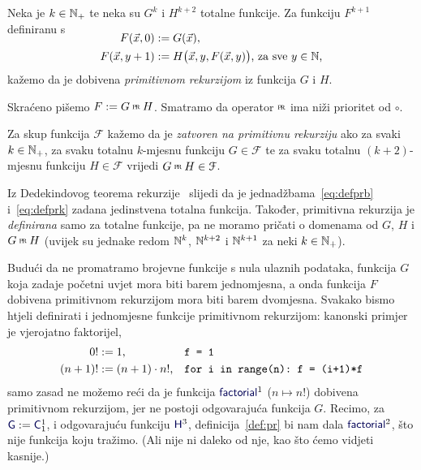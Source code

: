 
\begin{definicija}[{name=[primitivna rekurzija]}]\label{def:pr}
Neka je $k\in{\mathbb N}_+$ te neka su $G^k$ i $H^{k+2}$ totalne funkcije. Za funkciju $F^{k+1}$ definiranu s
\begin{align}
\SwapAboveDisplaySkip
\label{eq:defprb}
F(\vec x,0)&:=G(\vec x)\text,\\
\label{eq:defprk}
F(\vec x,y+1)&:=H\bigl(\vec x,y,F(\vec x,y)\bigr)\text{, za sve $y\in\N$,}
\end{align}
kažemo da je dobivena \emph{primitivnom rekurzijom} iz funkcija $G$ i $H$.

	Skraćeno pišemo $F:=G\pr H$. Smatramo da operator $\pr$ ima niži prioritet od $\circ$.

Za skup funkcija $\mathcal F$ kažemo da je \emph{zatvoren na primitivnu rekurziju} ako za svaki $k\in{\mathbb N}_+$, za svaku totalnu $k$-mjesnu funkciju $G\in\mathcal F$ te za svaku totalnu $(k+2)$-mjesnu funkciju $H\in\mathcal F$ vrijedi $G\pr H\in\mathcal F$.
\end{definicija}

\begin{napomena}[{name=[ulazi i izlaz primitivne rekurzije su totalne funkcije]}]\label{nap:prtot}
	Iz Dedekindovog teorema rekurzije~\cite{skr:VukTS} slijedi da je jednadžbama~\eqref{eq:defprb} i~\eqref{eq:defprk} zadana jedinstvena totalna funkcija. Također, primitivna rekurzija je \emph{definirana} samo za totalne funkcije, pa ne moramo pričati o domenama od $G$, $H$ i $G\pr H$ (uvijek su jednake redom ${\mathbb N}^k$, ${\mathbb N}^{k+2}$ i ${\mathbb N}^{k+1}$ za neki $k\in{\mathbb N}_+\mspace{-1mu}$).
\end{napomena}

Budući da ne promatramo brojevne funkcije s nula ulaznih podataka, funkcija $G$ koja zadaje početni uvjet mora biti barem jednomjesna, a onda funkcija $F$ dobivena primitivnom rekurzijom mora biti barem dvomjesna. Svakako bismo htjeli definirati i jednomjesne funkcije primitivnom rekurzijom: kanonski primjer je vjerojatno faktorijel,
\begin{align}
\label{eq:faktb}
	0!&:=1\text,&&\texttt{f = 1}\\
\label{eq:faktk}
	(n+1)!&:=(n+1)\cdot n!\text,&&\texttt{for i in range(n):~f = (i+1)*f}
\end{align}
samo zasad ne možemo reći da je funkcija $\f{factorial}^1$ ($n\mapsto n!$) dobivena primitivnom rekurzijom, jer ne postoji odgovarajuća funkcija $G$. Recimo, za $\f G:=\f C_1^1$, i odgovarajuću funkciju $\f H^3$, definicija~\ref{def:pr} bi nam dala $\f{factorial}^2$, što nije funkcija koju tražimo. (Ali nije ni daleko od nje, kao što ćemo vidjeti kasnije.)

